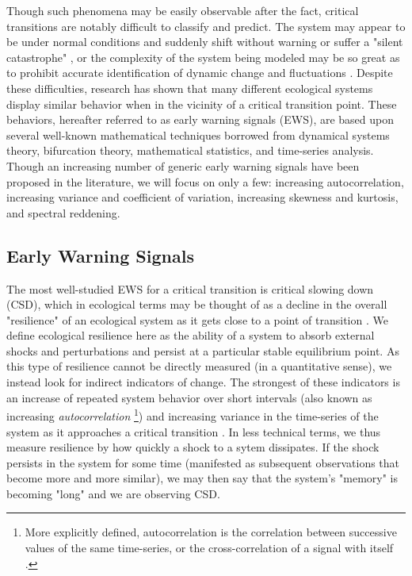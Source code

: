 \documentclass[12pt]{article}
\begin{document}
Though such phenomena may be easily observable after the fact, critical transitions are notably difficult to classify and predict. The system may appear to be under normal conditions and suddenly shift without warning or suffer a "silent catastrophe" \cite{Boerlijst2013}, or the complexity of the system being modeled may be so great as to prohibit accurate identification of dynamic change and fluctuations \cite{Green2005}. Despite these difficulties, research \cite{Scheffer2012}\cite{Seekell2013} has shown that many different ecological systems display similar behavior when in the vicinity of a critical transition point. These behaviors, hereafter referred to as early warning signals (EWS), are based upon several well-known mathematical techniques borrowed from dynamical systems theory, bifurcation theory, mathematical statistics, and time-series analysis. Though an increasing number of generic early warning signals have been proposed in the literature, we will focus on only a few: increasing autocorrelation, increasing variance and coefficient of variation, increasing skewness and kurtosis, and spectral reddening.

\subsection{Early Warning Signals}

The most well-studied EWS for a critical transition is critical slowing down (CSD), which in ecological terms may be thought of as a decline in the overall "resilience" of an ecological system as it gets close to a point of transition \cite{Carpenter2012}. We define ecological resilience here as the ability of a system to absorb external shocks and perturbations and persist at a particular stable equilibrium point. As this type of resilience cannot be directly measured (in a quantitative sense), we instead look for indirect indicators of change. The strongest of these indicators is an increase of repeated system behavior over short intervals (also known as increasing \emph{autocorrelation} \footnote{More explicitly defined, autocorrelation is the correlation between successive values of the same time-series, or the cross-correlation of a signal with itself \cite{Chatfield2000}.}) and increasing variance in the time-series of the system as it approaches a critical transition \cite{Holling1973}. In less technical terms, we thus measure resilience by how quickly a shock to a sytem dissipates. If the shock persists in the system for some time (manifested as subsequent observations that become more and more similar), we may then say that the system's "memory" is becoming "long" and we are observing CSD. \\
\end{document}
